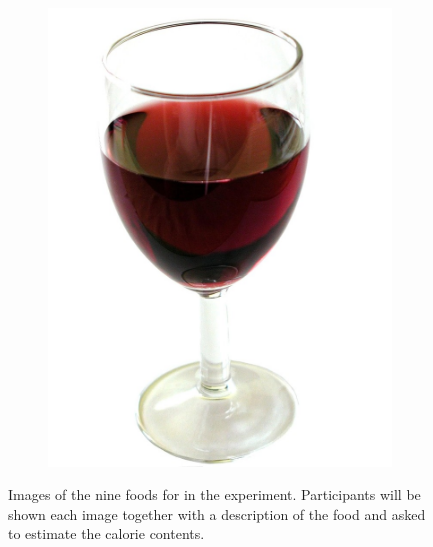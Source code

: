 \documentclass[a4paper,doc,natbib]{apa6}
\begin{document}
\begin{figure}[h!]
\begin{subfigure}[b]{0.28\textwidth}
\includegraphics[width=0.95\linewidth]{Images/wine.jpg}
 \end{subfigure}
\caption{Images of the nine foods for in the experiment. Participants will be shown each image together with a description of the food and  asked to estimate the calorie contents.}
\label{fig:foods}
\end{figure}
\end{document}
